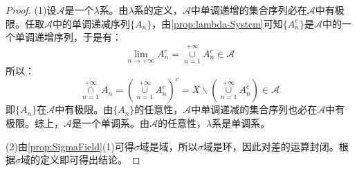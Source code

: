 \begin{proof}
	(1)设$\mathscr{A}$是一个$\lambda$系。由$\lambda$系的定义，$\mathscr{A}$中单调递增的集合序列必在$\mathscr{A}$中有极限。任取$\mathscr{A}$中的单调递减序列$\{A_n\}$，由\cref{prop:lambda-System}可知$\{A_n^c\}$是$\mathscr{A}$中的一个单调递增序列，于是有：
	\begin{equation*}
		\lim_{n\to+\infty}A_n^c=\underset{n=1}{\overset{+\infty}{\cup}}A_n^c\in\mathscr{A}
	\end{equation*}
	所以：
	\begin{equation*}
		\underset{n=1}{\overset{+\infty}{\cap}}A_n=\left(\underset{n=1}{\overset{+\infty}{\cup}}A_n^c\right)^c=X\backslash\left(\underset{n=1}{\overset{+\infty}{\cup}}A_n^c\right)\in\mathscr{A}
	\end{equation*}
	即$\{A_n\}$在$\mathscr{A}$中有极限。由$\{A_n\}$的任意性，$\mathscr{A}$中单调递减的集合序列也必在$\mathscr{A}$中有极限。综上，$\mathscr{A}$是一个单调系。由$\mathscr{A}$的任意性，$\lambda$系是单调系。\par
	(2)由\cref{prop:SigmaField}(1)可得$\sigma$域是域，所以$\sigma$域是环，因此对差的运算封闭。根据$\sigma$域的定义即可得出结论。
\end{proof}
